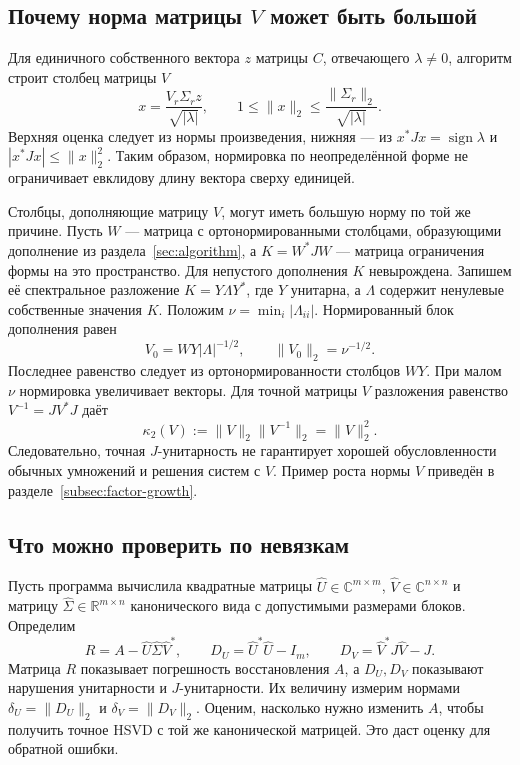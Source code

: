 \documentclass[a4paper,12pt]{article}
\theoremstyle{csstyle}
\newcommand{\HSVDComplex}{\mathbb C}
\begin{document}
\subsection{Почему норма матрицы $V$ может быть большой}

Для единичного собственного вектора $z$ матрицы $C$, отвечающего
$\lambda\ne0$, алгоритм строит столбец матрицы $V$
\[
x=\frac{V_r\Sigma_rz}{\sqrt{|\lambda|}},\qquad
1\le\|x\|_2\le\frac{\|\Sigma_r\|_2}{\sqrt{|\lambda|}}.
\]
Верхняя оценка следует из нормы произведения, нижняя --- из
$x^*Jx=\operatorname{sign}\lambda$ и
$|x^*Jx|\le\|x\|_2^2$.
Таким образом, нормировка по неопределённой форме не ограничивает
евклидову длину вектора сверху единицей.

Столбцы, дополняющие матрицу $V$, могут иметь большую норму по той же
причине. Пусть $W$ --- матрица с ортонормированными столбцами,
образующими дополнение из раздела~\ref{sec:algorithm}, а
$K=W^*JW$ --- матрица ограничения формы на это пространство.
Для непустого дополнения $K$ невырождена.
Запишем её спектральное разложение $K=Y\Lambda Y^*$, где $Y$ унитарна,
а $\Lambda$ содержит ненулевые собственные значения $K$.
Положим $\nu=\min_i|\Lambda_{ii}|$.
Нормированный блок дополнения равен
\[
V_0=WY|\Lambda|^{-1/2},\qquad \|V_0\|_2=\nu^{-1/2}.
\]
Последнее равенство следует из ортонормированности столбцов $WY$.
При малом $\nu$ нормировка увеличивает векторы.
Для точной матрицы $V$ разложения равенство $V^{-1}=JV^*J$
даёт
\[
\kappa_2(V):=\|V\|_2\|V^{-1}\|_2=\|V\|_2^2.
\]
Следовательно, точная $J$-унитарность не гарантирует хорошей
обусловленности обычных умножений и решения систем с $V$.
Пример роста нормы $V$ приведён в разделе~\ref{subsec:factor-growth}.

\subsection{Что можно проверить по невязкам}

Пусть программа вычислила квадратные матрицы
$\widehat U\in\HSVDComplex^{m\times m}$,
$\widehat V\in\HSVDComplex^{n\times n}$ и матрицу
$\widehat\Sigma\in\mathbb R^{m\times n}$ канонического вида
с допустимыми размерами блоков. Определим
\[
R=A-\widehat U\widehat\Sigma\widehat V^*,\qquad
D_U=\widehat U^*\widehat U-I_m,\qquad
D_V=\widehat V^*J\widehat V-J.
\]
Матрица $R$ показывает погрешность восстановления $A$, а $D_U,D_V$
показывают нарушения унитарности и $J$-унитарности.
Их величину измерим нормами
$\delta_U=\|D_U\|_2$ и $\delta_V=\|D_V\|_2$.
Оценим, насколько нужно изменить $A$, чтобы получить точное HSVD
с той же канонической матрицей. Это даст оценку для обратной ошибки.
\end{document}
